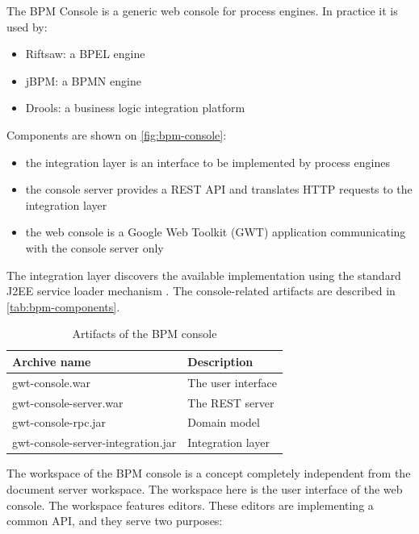 The BPM Console is a generic web console for process engines. In practice it is
used by:

\begin{itemize}
\item Riftsaw: a BPEL engine
\item jBPM: a BPMN engine
\item Drools: a business logic integration platform
\end{itemize}

Components are shown on \autoref{fig:bpm-console}:

\begin{itemize}
\item the integration layer is an interface to be implemented by process engines
\item the console server provides a REST API and translates HTTP requests to the integration layer
\item the web console is a Google Web Toolkit (GWT) application communicating with the console server only
\end{itemize}

The integration layer discovers the available implementation using the standard
J2EE service loader mechanism \cite{service-loader}. The console-related
artifacts are described in \autoref{tab:bpm-components}.

\begin{table}[H]
  \begin{center}
    \begin{tabular}{| l | l |}
    \hline
    \textbf{Archive name} & \textbf{Description} \\ \hline
    gwt-console.war & The user interface \\ \hline
    gwt-console-server.war & The REST server \\ \hline
    gwt-console-rpc.jar & Domain model \\ \hline
    gwt-console-server-integration.jar & Integration layer \\ \hline
    \end{tabular}
  \end{center}
  \caption{Artifacts of the BPM console}
  \label{tab:bpm-components}
\end{table}


The workspace of the BPM console is a concept completely independent from the
document server workspace. The workspace here is the user interface of the web
console. The workspace features editors. These editors are implementing a
common API, and they serve two purposes:

